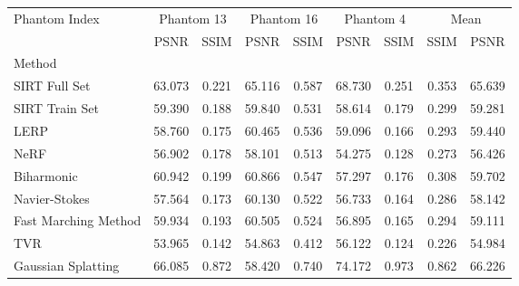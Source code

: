 \begin{tabular}{|l|cc|cc|cc|cc|}
\toprule
Phantom Index & \multicolumn{2}{c|}{Phantom 13} & \multicolumn{2}{c|}{Phantom 16} & \multicolumn{2}{c|}{Phantom 4} & \multicolumn{2}{c|}{Mean} \\
 & PSNR & SSIM & PSNR & SSIM & PSNR & SSIM & SSIM & PSNR \\
Method &  &  &  &  &  &  &  &  \\
\midrule
SIRT Full Set & 63.073 & 0.221 & 65.116 & 0.587 & 68.730 & 0.251 & 0.353 & 65.639 \\
SIRT Train Set & 59.390 & 0.188 & 59.840 & 0.531 & \cellcolor{rankthird}58.614 & \cellcolor{ranksecond}0.179 & \cellcolor{rankthird}0.299 & 59.281 \\
LERP & 58.760 & 0.175 & \cellcolor{rankthird}60.465 & \cellcolor{rankthird}0.536 & \cellcolor{ranksecond}59.096 & 0.166 & 0.293 & \cellcolor{rankthird}59.440 \\
NeRF & 56.902 & 0.178 & 58.101 & 0.513 & \cellcolor{rankworst}54.275 & 0.128 & 0.273 & 56.426 \\
Biharmonic & \cellcolor{ranksecond}60.942 & \cellcolor{ranksecond}0.199 & \cellcolor{rankfirst}60.866 & \cellcolor{ranksecond}0.547 & 57.297 & \cellcolor{rankthird}0.176 & \cellcolor{ranksecond}0.308 & \cellcolor{ranksecond}59.702 \\
Navier-Stokes & 57.564 & 0.173 & 60.130 & 0.522 & 56.733 & 0.164 & 0.286 & 58.142 \\
Fast Marching Method & \cellcolor{rankthird}59.934 & \cellcolor{rankthird}0.193 & \cellcolor{ranksecond}60.505 & 0.524 & 56.895 & 0.165 & 0.294 & 59.111 \\
TVR & \cellcolor{rankworst}53.965 & \cellcolor{rankworst}0.142 & \cellcolor{rankworst}54.863 & \cellcolor{rankworst}0.412 & 56.122 & \cellcolor{rankworst}0.124 & \cellcolor{rankworst}0.226 & \cellcolor{rankworst}54.984 \\
Gaussian Splatting & \cellcolor{rankfirst}66.085 & \cellcolor{rankfirst}0.872 & 58.420 & \cellcolor{rankfirst}0.740 & \cellcolor{rankfirst}74.172 & \cellcolor{rankfirst}0.973 & \cellcolor{rankfirst}0.862 & \cellcolor{rankfirst}66.226 \\
\bottomrule
\end{tabular}
